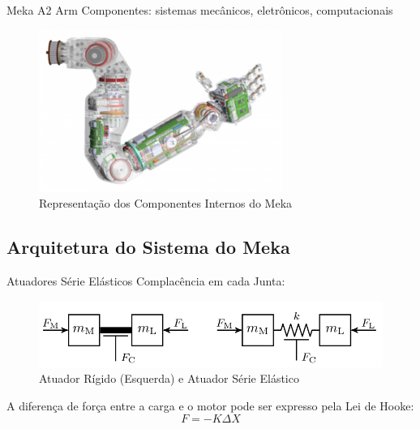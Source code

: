\documentclass{beamer}
\begin{document}

\begin{frame}{Meka A2 Arm}
Componentes: sistemas mecânicos, eletrônicos, computacionais
\begin{figure}
    \centering
    \includegraphics[width = 0.8\linewidth]{tex/figs/meka-arm-inside}
    \caption{Representação dos Componentes Internos do Meka}
    \label{fig:mekainside}
\end{figure}
\end{frame}

\subsection{Arquitetura do Sistema do Meka}

\begin{frame}{Atuadores Série Elásticos}
Complacência em cada Junta:
\begin{figure}
    \centering
    \includegraphics[width = 0.8\linewidth]{tex/figs/sea_ulrich.png}
    \caption{Atuador Rígido (Esquerda) e Atuador Série Elástico}
    \label{fig:mekainside}
\end{figure}
A diferença de força entre a carga e o motor pode ser expresso pela Lei de Hooke:
\begin{equation}
    F = -K\Delta X
\end{equation}
\end{frame}
\end{document}
